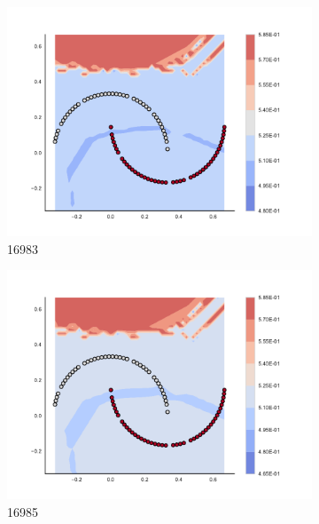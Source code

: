 \begin{figure}[h]
\begin{subfigure}[b]{0.09\textwidth}
    \includegraphics[clip, trim=2.35cm 1.75cm 4.5cm 0cm,width=\textwidth]{img/convergence/16983.pdf}
    \caption{16983}
    \label{fig:convergence_16983}
\end{subfigure}
%
\begin{subfigure}[b]{0.09\textwidth}
    \includegraphics[clip, trim=2.35cm 1.75cm 4.5cm 0cm,width=\textwidth]{img/convergence/16985.pdf}
    \caption{16985}
    \label{fig:convergence_16985}
\end{subfigure}
%
\begin{subfigure}[b]{0.09\textwidth}

\end{subfigure}
\end{figure}
